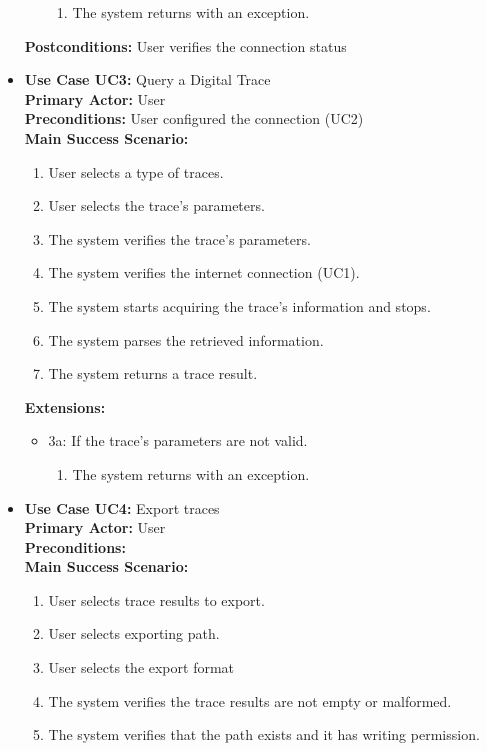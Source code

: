 \documentclass[
	a4paper,					10pt,							twoside,					openright,				notitlepage,			parskip=half,			]{scrreprt}
\begin{document}
\begin{itemize}
\begin{itemize}
		\begin{enumerate}
			\item The system returns with an exception.
		\end{enumerate}
	\end{itemize}	
\textbf{Postconditions:} User verifies the connection status \\
\item\textbf{Use Case UC3:} Query a Digital Trace\\
\textbf{Primary Actor:} User\\
\textbf{Preconditions:} User configured the connection (UC2)\\
\textbf{Main Success Scenario:}
	\begin{enumerate}
	\item User selects a type of traces.
	\item User selects the trace's parameters.
	\item The system verifies the trace's parameters.
	\item The system verifies the internet connection (UC1).
	\item The system starts acquiring the trace's information and stops.
	\item The system parses the retrieved information.
	\item The system returns a trace result.
	\end{enumerate}
\textbf{Extensions:}
	\begin{itemize}
	\item 3a: If the trace's parameters are not valid.
		\begin{enumerate}
			\item The system returns with an exception.
		\end{enumerate}
	\end{itemize}	
\item\textbf{Use Case UC4:} Export traces\\
\textbf{Primary Actor:} User\\
\textbf{Preconditions: } \\
\textbf{Main Success Scenario:}
	\begin{enumerate}
	\item User selects trace results to export.
	\item User selects exporting path.
	\item User selects the export format
	\item The system verifies the trace results are not empty or malformed.
	\item The system verifies that the path exists and it has writing permission.

\end{enumerate}
\end{itemize}
\end{document}
